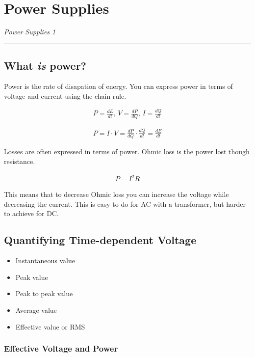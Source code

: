 \section{Power Supplies}

\begin{center}
\textit{Power Supplies 1}
\vspace{1mm}
\hrule
\end{center}

\subsection{What \textit{is} power?}

Power is the rate of disapation of energy. You can express power in terms of voltage and current using the chain rule.

\begin{align*}
P = \frac{dE}{dt},\, V = \frac{dP}{dQ},\, I = \frac{dQ}{dt}
\end{align*}

\begin{align*}
P = I \cdot V = \frac{dP}{dQ} \cdot \frac{dQ}{dt} = \frac{dE}{dt}
\end{align*}

Losses are often expressed in terms of power. Ohmic loss is the power lost though resistance. 

\begin{align*}
P = I^2R
\end{align*}

This means that to decrease Ohmic loss you can increase the voltage while decreasing the current. This is easy to do for AC with a transformer, but harder to achieve for DC.

\subsection{Quantifying Time-dependent Voltage}

\begin{itemize}
	\item Instantaneous value
	\item Peak value
	\item Peak to peak value
	\item Average value
	\item Effective value or RMS
\end{itemize}

\subsubsection{Effective Voltage and Power}

